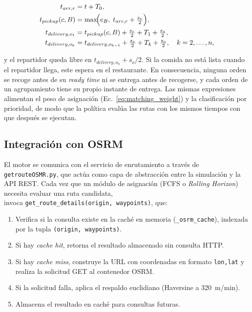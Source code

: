 \documentclass[12pt,letterpaper,oneside]{book}
\begin{document}
	\begin{align}
		t_{arr,r}   &= t + T_0, \\
		t_{pickup}(c,B) &= \max\!\Bigl(e_B,\; t_{arr,r} + \tfrac{s_r}{2}\Bigr), \\
		t_{delivery,o_1} &= t_{pickup}(c,B) + \tfrac{s_r}{2} + T_1 + \tfrac{s_o}{2}, \\
		t_{delivery,o_k} &= t_{delivery,o_{k-1}} + \tfrac{s_o}{2} + T_k + \tfrac{s_o}{2}, \quad k = 2, \ldots, n,
	\end{align}

	\noindent y el repartidor queda libre en $t_{delivery,o_n} + s_o/2$.  Si la comida no está lista
	cuando el repartidor llega, este espera en el restaurante.  En consecuencia, ninguna orden se
	recoge antes de su \textit{ready time} ni se entrega antes de recogerse, y cada orden de un
	agrupamiento tiene su propio instante de entrega.  Las mismas expresiones alimentan el peso de
	asignación (Ec.~\ref{eq:matching_weight}) y la clasificación por prioridad, de modo que la
	política evalúa las rutas con los mismos tiempos con que después se ejecutan.

	\subsection{Integración con OSRM}

	El motor se comunica con el servicio de enrutamiento a través de \texttt{getrouteOSMR.py},
	que actúa como capa de abstracción entre la simulación y la API REST. Cada vez que un
	módulo de asignación (FCFS o \textit{Rolling Horizon}) necesita evaluar una ruta candidata,\\
	invoca \texttt{get\_route\_details(origin, waypoints)}, que:

	\begin{enumerate}
		\item Verifica si la consulta existe en la caché en memoria (\texttt{\_osrm\_cache}), 
		indexada por la tupla \texttt{(origin, waypoints)}.
		\item Si hay \textit{cache hit}, retorna el resultado almacenado sin consulta HTTP.
		\item Si hay \textit{cache miss}, construye la URL con coordenadas en formato 
		\texttt{lon,lat} y realiza la solicitud GET al contenedor OSRM.
		\item Si la solicitud falla, aplica el respaldo euclidiano (Haversine a 320~m/min).
		\item Almacena el resultado en caché para consultas futuras.
	\end{enumerate}
\end{document}
